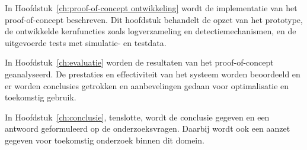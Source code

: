 In Hoofdstuk~\ref{ch:proof-of-concept ontwikkeling} wordt de implementatie van het proof-of-concept beschreven. Dit hoofdstuk behandelt de opzet van het prototype, de ontwikkelde kernfuncties zoals logverzameling en detectiemechanismen, en de uitgevoerde tests met simulatie- en testdata.

In Hoofdstuk~\ref{ch:evaluatie} worden de resultaten van het proof-of-concept geanalyseerd. De prestaties en effectiviteit van het systeem worden beoordeeld en er worden conclusies getrokken en aanbevelingen gedaan voor optimalisatie en toekomstig gebruik.

In Hoofdstuk~\ref{ch:conclusie}, tenslotte, wordt de conclusie gegeven en een antwoord geformuleerd op de onderzoeksvragen. Daarbij wordt ook een aanzet gegeven voor toekomstig onderzoek binnen dit domein.